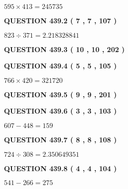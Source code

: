 \documentclass{ctexart}
\begin{document}
 

$ %
595 \times  %
413=   %
245735$
 
 
  
\vspace{0.2in}
  
{\textbf{\Large{QUESTION
439.2 
 ( 7 , 7 , 107 )
}}}
  
  
 
 

$ %
823 \div  %
371=   %
2.218328841$
 
 
  
\vspace{0.2in}
  
{\textbf{\Large{QUESTION
439.3 
 ( 10 , 10 , 202 )
}}}
  
  
  
\vspace{0.2in}
  
{\textbf{\Large{QUESTION
439.4 
 ( 5 , 5 , 105 )
}}}
  
  
 
 

$ %
766 \times  %
420=   %
321720$
 
 
  
\vspace{0.2in}
  
{\textbf{\Large{QUESTION
439.5 
 ( 9 , 9 , 201 )
}}}
  
  
  
\vspace{0.2in}
  
{\textbf{\Large{QUESTION
439.6 
 ( 3 , 3 , 103 )
}}}
  
  
 
 

$ %
607 -  %
448=   %
159$
 
 
  
\vspace{0.2in}
  
{\textbf{\Large{QUESTION
439.7 
 ( 8 , 8 , 108 )
}}}
  
  
 
 

$ %
724 \div  %
308=   %
2.350649351$
 
 
  
\vspace{0.2in}
  
{\textbf{\Large{QUESTION
439.8 
 ( 4 , 4 , 104 )
}}}
  
  
 
 

$ %
541 -  %
266=   %
275$
 
\end{document}
